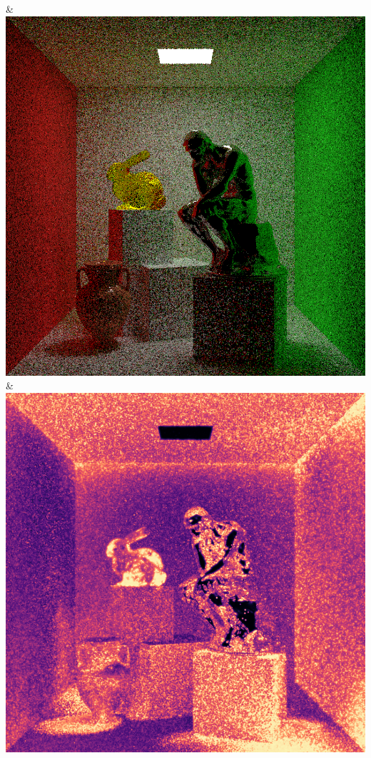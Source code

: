 & \includegraphics[width=\linewidth]{figures/py/tests/quality_comparison/sppm_1spp_thinker.png}
\\
& \includegraphics[width=\linewidth]{figures/py/tests/quality_comparison/pt_1spp_thinker_flip.png}
